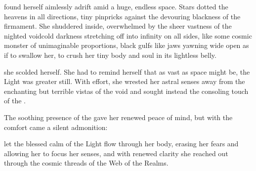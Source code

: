 
\Esmerel{} found herself aimlessly adrift amid a huge, endless space. Stars dotted the heavens in all directions, tiny pinpricks against the devouring blackness of the firmament. 
She shuddered inside, overwhelmed by the sheer vastness of the nighted void\dash cold darkness stretching off into infinity on all sides, 
like some cosmic monster of unimaginable proportions, black gulfs like jaws yawning wide open as if to swallow her, to crush her tiny body and soul in its lightless belly. 

 she scolded herself.  She had to remind herself that as vast as space might be, the Light was greater still. 
With effort, she wrested her astral senses away from the enchanting but terrible vistas of the void and sought instead the consoling touch of the \sephiroth. 

The soothing presence of the \Archons{} gave her renewed peace of mind, 
but with the comfort came a silent admonition:  

% 

\Esmerel{} let the blessed calm of the Light flow through her body, erasing her fears and allowing her to focus her senses, and with renewed clarity she reached out through the cosmic threads of the Web of the Realms. 

